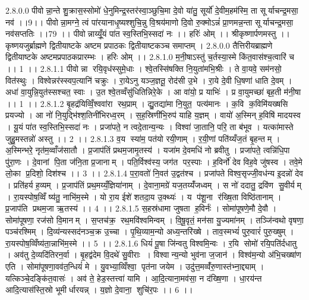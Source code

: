 2.8.0.0
पीवोन्ना॒न्ते शु॒क्रास॒स्सोमो॑ धे॒नुमिन्द्र॒स्तर॑स्वा॒ञ्छुचि॒मा दे॒वो या॑तु॒ सूर्यो॑ दे॒वीम॒हम॑स्मि॒ ता सूर्याचन्द्र॒मसा॒ नव॑ ।।9।। पीवोन्ना॒मग्ने॒ त्वं पा॑रयानाधृ॒ष्यश्शुचि॒न्नु वि॒श्रय॑माणो दि॒वो रु॒क्मोऽन्नं॑ प्रा॒णमन्न॒न्ता सूर्याचन्द्र॒मसा॒ नव॑सप्ततिः ।।79 ।। पीवोन्नाय्यूँ॒यं पा॑त स्व॒स्तिभि॒स्सदा॑ नः ।। हरिः॑ ओम् ।। श्रीकृष्णार्पणमस्तु ।। कृष्णयजुर्ब्राह्मणे द्वितीयाष्टके अष्टम प्रपाठकः द्वितीयाष्टकञ्च समाप्तम् ।
2.8.0.0
तैत्तिरीयब्राह्मणे द्वितीयाष्टके अष्टमप्रपाठकप्रारम्भः । हरिः ओम् ।।
2.8.1.0
म॒नी॒षाऽस्तु॑ च॒र्तस्या॒स्मे कि॑त॒वास॑श्च॒त्वारि॑ च ।। 1 ।।
2.8.1.1
पीवोन्ना रयि॒वृध॑स्सुमे॒धाः । श्वे॒तस्सि॑षक्ति नि॒युता॑मभि॒श्रीः । ते वा॒यवे॒ सम॑नसो॒ वित॑स्थुः । विश्वेन्नर॑स्स्वप॒त्यानि॑ चक्रुः । रा॒येऽनु यञ्ज॒ज्ञतू॒ रोद॑सी उ॒भे । रा॒ये दे॒वी धि॒षणा॑ धाति दे॒वम् । अधा॑ वा॒युन्नि॒युत॑स्सश्चत॒ स्वाः । उ॒त श्वे॒तव्वँसु॑धितिन्निरे॒के । आ वा॑यो॒ प्र याभिः॑ । प्र वा॒युमच्छा॑ बृह॒ती म॑नी॒षा ।। 1 ।।
2.8.1.2
बृ॒हद्र॑यिव्विँ॒श्ववा॑रा रथ॒प्राम् । द्यु॒तद्या॑मा नि॒युत॒ पत्य॑मानः । क॒वि क॒विमि॑यख्षसि प्रयज्यो । आ नो॑ नि॒युद्भि॑श्श॒तिनी॑भिरध्व॒रम् । स॒ह॒स्रिणी॑भि॒रुप॑ याहि य॒ज्ञम् । वायो॑ अ॒स्मिन् ह॒विषि॑ मादयस्व । यू॒यं पा॑त स्व॒स्तिभि॒स्सदा॑ नः । प्रजा॑पते॒ न त्वदे॒तान्य॒न्यः । विश्वा॑ जा॒तानि॒ परि॒ ता ब॑भूव । यत्का॑मास्ते जुहु॒मस्तन्नो॑ अस्तु ।। 2 ।।
2.8.1.3
व॒य स्या॑म॒ पत॑यो रयी॒णाम् । र॒यी॒णां पति॑य्यँज॒तं बृ॒हन्तम् । अ॒स्मिन्भरे॒ नृत॑म॒व्वाँज॑सातौ । प्र॒जाप॑तिं प्रथम॒जामृ॒तस्य॑ । यजा॑म दे॒वमधि॑ नो ब्रवीतु । प्रजा॑पते॒ त्वन्नि॑धि॒पा पु॑रा॒णः । दे॒वानां पि॒ता ज॑नि॒ता प्र॒जानाम् । पति॒र्विश्व॑स्य॒ जग॑त पर॒स्पाः । ह॒विर्नो॑ देव विह॒वे जु॑षस्व । तवे॒मे लो॒का प्र॒दिशो॒ दिश॑श्च ।। 3 ।।
2.8.1.4
प॒रा॒वतो॑ नि॒वत॑ उ॒द्वत॑श्च । प्रजा॑पते विश्व॒सृज्जी॒वध॑न्य इ॒दन्नो॑ देव । प्रति॑हर्य ह॒व्यम् । प्र॒जाप॑तिं प्रथ॒मय्यँ॒ज्ञिया॑नाम् । दे॒वाना॒मग्रे॑ यज॒तय्यँ॑जध्वम् । स नो॑ ददातु॒ द्रवि॑ण सु॒वीर्यम् । रा॒यस्पोष॒व्विँ ष्य॑तु॒ नाभि॑म॒स्मे । यो रा॒य ईशे॑ शतदा॒य उ॒क्थ्यः॑ । य प॑शू॒ना र॑ख्षि॒ता विष्ठि॑तानाम् । प्र॒जाप॑ति प्रथम॒जा ऋ॒तस्य॑ ।। 4 ।।
2.8.1.5
स॒हस्र॑धामा जुषता ह॒विर्नः॑ । सोमा॑पूषणे॒मौ दे॒वौ । सोमा॑पूषणा॒ रज॑सो वि॒मानम् । स॒प्तच॑क्र॒॒ रथ॒मवि॑श्वमिन्वम् । वि॒षू॒वृतं॒ मन॑सा यु॒ज्यमा॑नम् । तञ्जि॑न्वथो वृषणा॒ पञ्च॑रश्मिम् । दि॒व्य॑न्यस्सद॑नञ्च॒क्र उ॒च्चा । पृ॒थि॒व्याम॒न्यो अध्य॒न्तरि॑ख्षे । ताव॒स्मभ्यं॑ पुरु॒वारं॑ पुरु॒ख्षुम् । रा॒यस्पोष॒व्विँष्य॑ता॒न्नाभि॑म॒स्मे ।। 5 ।।
2.8.1.6
धियं॑ पू॒षा जि॑न्वतु विश्वमि॒न्वः । र॒यि सोमो॑ रयि॒पति॑र्दधातु । अव॑तु दे॒व्यदि॑तिरन॒र्वा । बृ॒हद्व॑देम वि॒दथे॑ सु॒वीराः । विश्वान्य॒न्यो भुव॑ना ज॒जान॑ । विश्व॑म॒न्यो अ॑भि॒चख्षा॑ण एति । सोमा॑पूषणा॒वव॑त॒न्धियं॑ मे । यु॒वभ्या॒व्विँश्वा॒ पृत॑ना जयेम । उदु॑त्त॒मव्वँ॑रु॒णास्त॑भ्ना॒द्द्याम् । यत्किञ्चे॒दङ्कि॑त॒वासः॑ । अव॑ ते॒ हेड॒स्तत्त्वा॑ यामि । आ॒दि॒त्याना॒मव॑सा॒ न द॑ख्षि॒णा । धा॒रय॑न्त आदि॒त्यास॑स्ति॒स्रो भूमीर्धारयन्न् । य॒ज्ञो दे॒वाना॒॒ शुचि॑र॒पः ।। 6 ।।
